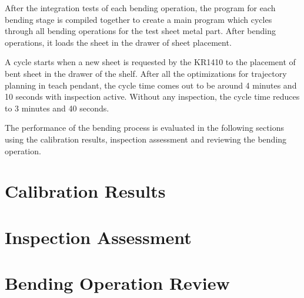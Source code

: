 After the integration tests of each bending operation, the program for each bending stage is compiled together to create a main program which cycles through all bending operations for the test sheet metal part. After bending operations, it loads the sheet in the drawer of sheet placement.

A cycle starts when a new sheet is requested by the KR1410 to the placement of bent sheet in the drawer of the shelf. After all the optimizations for trajectory planning in teach pendant, the cycle time comes out to be around 4 minutes and 10 seconds with inspection active. Without any inspection, the cycle time reduces to 3 minutes and 40 seconds.

The performance of the bending process is evaluated in the following sections using the calibration results, inspection assessment and reviewing the bending operation.

\section{Calibration Results}
\label{sec:calibration-results}

\FloatBarrier  %

\section{Inspection Assessment}
\label{sec:inspection-assessment}

\FloatBarrier  %

\section{Bending Operation Review}
\label{sec:calibration-results}

\FloatBarrier  %


